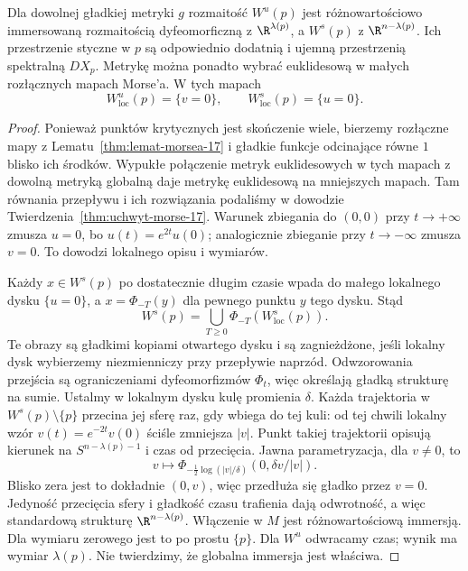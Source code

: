 \begin{twierdzenie}
\label{thm:stable-morse-17}
Dla dowolnej gładkiej metryki $g$ rozmaitość
$W^u(p)$ jest różnowartościowo
immersowaną rozmaitością
dyfeomorficzną z $\R^{\lambda(p)}$,
a $W^s(p)$ z $\R^{n-\lambda(p)}$.
Ich przestrzenie styczne w $p$ są odpowiednio
dodatnią i ujemną przestrzenią spektralną $DX_p$.
Metrykę można ponadto wybrać euklidesową
w małych rozłącznych mapach Morse'a. W tych mapach
\[
 W^u_{\mathrm{loc}}(p)=\{v=0\},
 \qquad
 W^s_{\mathrm{loc}}(p)=\{u=0\}.
\]
\end{twierdzenie}
\begin{proof}
Ponieważ punktów krytycznych
jest skończenie wiele, bierzemy
rozłączne mapy z
Lematu~\ref{thm:lemat-morsea-17}
i gładkie funkcje odcinające
równe $1$ blisko ich środków.
Wypukłe połączenie
metryk euklidesowych w tych
mapach z dowolną metryką
globalną daje metrykę
euklidesową na mniejszych mapach.
Tam równania przepływu
i ich rozwiązania podaliśmy
w dowodzie
Twierdzenia~\ref{thm:uchwyt-morse-17}.
Warunek zbiegania do $(0,0)$
przy $t\to+\infty$ zmusza $u=0$,
bo $u(t)=e^{2t}u(0)$;
analogicznie zbieganie
przy $t\to-\infty$ zmusza $v=0$.
To dowodzi lokalnego opisu
i wymiarów.

Każdy $x\in W^s(p)$
po dostatecznie długim czasie
wpada do małego lokalnego
dysku $\{u=0\}$, a
$x=\Phi_{-T}(y)$
dla pewnego punktu $y$
tego dysku. Stąd
\[
 W^s(p)=\bigcup_{T\geq0}
      \Phi_{-T}(W^s_{\mathrm{loc}}(p)).
\]
Te obrazy są gładkimi kopiami
otwartego dysku i są
zagnieżdżone, jeśli lokalny
dysk wybierzemy niezmienniczy
przy przepływie naprzód.
Odwzorowania przejścia są
ograniczeniami dyfeomorfizmów
$\Phi_t$, więc określają
gładką strukturę na sumie.
Ustalmy w lokalnym dysku
kulę promienia $\delta$.
Każda trajektoria w
$W^s(p)\setminus\{p\}$
przecina jej sferę raz, gdy
wbiega do tej kuli: od tej
chwili lokalny wzór
$v(t)=e^{-2t}v(0)$
ściśle zmniejsza $|v|$.
Punkt takiej trajektorii
opisują kierunek na
$S^{n-\lambda(p)-1}$
i czas od przecięcia.
Jawna parametryzacja, dla $v\ne0$, to
\[
 v\longmapsto
 \Phi_{-\frac12\log(|v|/\delta)}
          (0,\delta v/|v|).
\]
Blisko zera jest to dokładnie $(0,v)$,
więc przedłuża się gładko przez $v=0$.
Jedyność przecięcia sfery i gładkość czasu trafienia
dają odwrotność, a więc standardową
strukturę $\R^{n-\lambda(p)}$.
Włączenie w $M$ jest
różnowartościową immersją.
Dla wymiaru zerowego
jest to po prostu $\{p\}$.
Dla $W^u$ odwracamy czas;
wynik ma wymiar $\lambda(p)$.
Nie twierdzimy, że globalna
immersja jest właściwa.


\end{proof}
